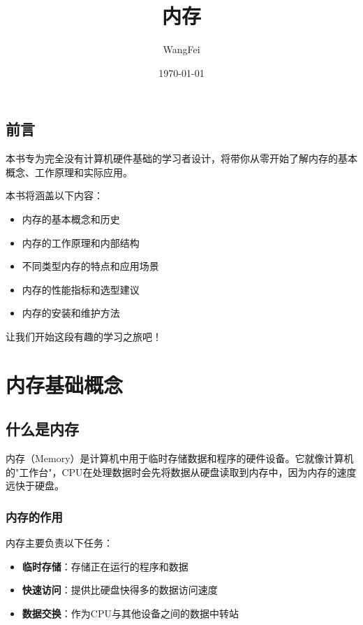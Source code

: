 \documentclass[12pt,UTF8]{ctexbook}
\title{\heiti\zihao{0} 内存}
\author{WangFei}
\date{\today}
\begin{document}
\maketitle
\tableofcontents

\frontmatter
\chapter{前言}

本书专为完全没有计算机硬件基础的学习者设计，将带你从零开始了解内存的基本概念、工作原理和实际应用。

本书将涵盖以下内容：
\begin{itemize}
    \item 内存的基本概念和历史
    \item 内存的工作原理和内部结构
    \item 不同类型内存的特点和应用场景
    \item 内存的性能指标和选型建议
    \item 内存的安装和维护方法
\end{itemize}

让我们开始这段有趣的学习之旅吧！

\mainmatter

\part{内存基础概念}

\chapter{什么是内存}

内存（Memory）是计算机中用于临时存储数据和程序的硬件设备。它就像计算机的"工作台"，CPU在处理数据时会先将数据从硬盘读取到内存中，因为内存的速度远快于硬盘。

\section{内存的作用}

内存主要负责以下任务：

\begin{itemize}[leftmargin=2em]
    \item \textbf{临时存储}：存储正在运行的程序和数据
    \item \textbf{快速访问}：提供比硬盘快得多的数据访问速度
    \item \textbf{数据交换}：作为CPU与其他设备之间的数据中转站
\end{itemize}
\end{document}
